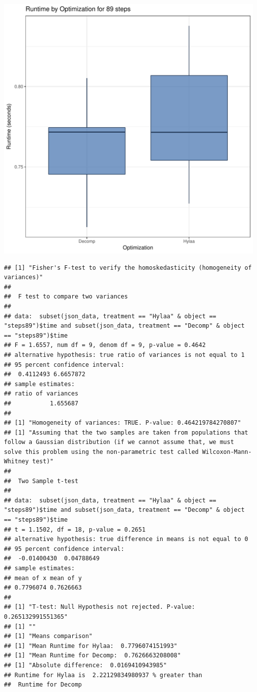 \documentclass{article}\usepackage[]{graphicx}\usepackage[]{color}
\makeatletter
\def\maxwidth{ %
  \ifdim\Gin@nat@width>\linewidth
    \linewidth
  \else
    \Gin@nat@width
  \fi
}
\newenvironment{kframe}{%
 \def\at@end@of@kframe{}%
 \ifinner\ifhmode%
  \def\at@end@of@kframe{\end{minipage}}%
  \begin{minipage}{\columnwidth}%
 \fi\fi%
 \def\FrameCommand##1{\hskip\@totalleftmargin \hskip-\fboxsep
 \colorbox{shadecolor}{##1}\hskip-\fboxsep
     \hskip-\linewidth \hskip-\@totalleftmargin \hskip\columnwidth}%
 \MakeFramed {\advance\hsize-\width
   \@totalleftmargin\z@ \linewidth\hsize
   \@setminipage}}%
 {\par\unskip\endMakeFramed%
 \at@end@of@kframe}
\newenvironment{knitrout}{}{} %
\makeatother
\begin{document}
\begin{knitrout}
\color{fgcolor}
\includegraphics[width=\maxwidth]{figure/RH2_steps89-1} 
\begin{kframe}\begin{verbatim}
## [1] "Fisher's F-test to verify the homoskedasticity (homogeneity of variances)"
## 
## 	F test to compare two variances
## 
## data:  subset(json_data, treatment == "Hylaa" & object == "steps89")$time and subset(json_data, treatment == "Decomp" & object == "steps89")$time
## F = 1.6557, num df = 9, denom df = 9, p-value = 0.4642
## alternative hypothesis: true ratio of variances is not equal to 1
## 95 percent confidence interval:
##  0.4112493 6.6657872
## sample estimates:
## ratio of variances 
##           1.655687 
## 
## [1] "Homogeneity of variances: TRUE. P-value: 0.464219784270807"
## [1] "Assuming that the two samples are taken from populations that follow a Gaussian distribution (if we cannot assume that, we must solve this problem using the non-parametric test called Wilcoxon-Mann-Whitney test)"
## 
## 	Two Sample t-test
## 
## data:  subset(json_data, treatment == "Hylaa" & object == "steps89")$time and subset(json_data, treatment == "Decomp" & object == "steps89")$time
## t = 1.1502, df = 18, p-value = 0.2651
## alternative hypothesis: true difference in means is not equal to 0
## 95 percent confidence interval:
##  -0.01400430  0.04788649
## sample estimates:
## mean of x mean of y 
## 0.7796074 0.7626663 
## 
## [1] "T-test: Null Hypothesis not rejected. P-value: 0.265132991551365"
## [1] ""
## [1] "Means comparison"
## [1] "Mean Runtime for Hylaa:  0.7796074151993"
## [1] "Mean Runtime for Decomp:  0.7626663208008"
## [1] "Absolute difference:  0.0169410943985"
## Runtime for Hylaa is  2.22129834980937 % greater than 
##  Runtime for Decomp
\end{verbatim}
\end{kframe}
\end{knitrout}
\end{document}
